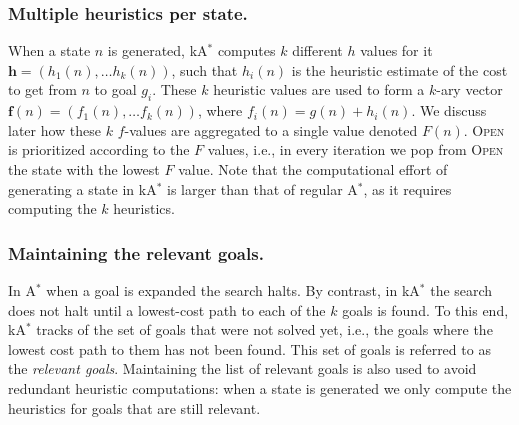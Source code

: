 \documentclass{aicom2e}
\newcommand{\astar}{A$^*$}
\newcommand{\kastar}{kA$^*$}
\newcommand{\open}{\textsc{Open}}
\begin{document}
\subsubsection*{Multiple heuristics per state.} When a state $n$ is generated, \kastar{} computes 
$k$ different $h$ values for it $\textbf{h}=(h_1(n),\ldots h_k(n))$, such that $h_i(n)$ is the heuristic estimate of the cost to get from $n$ to goal $g_i$. These $k$ heuristic values are used to form a $k$-ary vector $\textbf{f}(n)=(f_1(n),\ldots f_k(n))$, where $f_i(n)=g(n)+h_i(n)$. We discuss later how these $k$ $f$-values are aggregated to a single value denoted $F(n)$. \open{} is prioritized according to the $F$ values, i.e., in every iteration we pop from \open{} the state with the lowest $F$ value. Note that the computational effort of generating a state in \kastar{} is larger than that of regular \astar{}, as it requires computing the $k$ heuristics. %

\subsubsection*{Maintaining the relevant goals.} In \astar{} when a goal is expanded the search halts. By contrast, in \kastar{} the search does not halt until a lowest-cost path to each of the $k$ goals is found. To this end, \kastar{} tracks of the set of goals that were not solved yet, i.e., the goals where the lowest cost path to them has not been found. This set of goals is referred to as the {\em relevant goals}. Maintaining the list of relevant goals is also used to avoid redundant heuristic computations: when a state is generated we only compute the heuristics for goals that are still relevant. 



\end{document}
